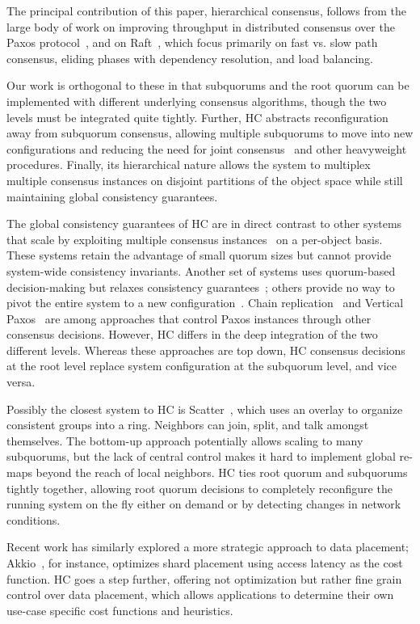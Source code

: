 \documentclass[11pt,conference]{IEEEtran}
\newcommand{\hc}{hierarchical consensus\xspace}
\newcommand{\sub}{subquorum\xspace}
\newcommand{\subs}{subquorums\xspace}
\newcommand{\roo}{root quorum\xspace}
\begin{document}
The principal contribution of this paper, \hc, follows from the
large body of work on improving throughput in distributed consensus 
over the Paxos protocol~\cite{paxos_simple,epaxos,flexible_paxos,generalized_paxos}, 
and on Raft~\cite{raft,howard_raft_2015}, which focus primarily on fast vs.
slow path consensus, eliding phases with dependency resolution, and load
balancing.

Our work is orthogonal to these in that \subs and the \roo can be
implemented with different underlying consensus algorithms, though the
two levels must be integrated quite tightly.
Further, HC abstracts reconfiguration away from \sub consensus, allowing
multiple \subs to move into new configurations and reducing the need
for joint consensus~\cite{raft} and other heavyweight procedures.
Finally, its hierarchical nature allows the system to multiplex multiple
consensus instances on disjoint partitions of the object space while
still maintaining global consistency guarantees.

The global consistency guarantees of HC are in direct contrast to other
systems that scale by exploiting multiple consensus
instances~\cite{bigtable,mdcc,spanner} on a per-object basis.
These systems retain the advantage of small quorum sizes but cannot provide
system-wide consistency invariants.
Another set of systems uses quorum-based decision-making but relaxes
consistency guarantees~\cite{dynamo,pnuts,cops}; others provide no way to
pivot the entire system to a new configuration~\cite{scatter}.
Chain replication~\cite{van2004chain} and Vertical Paxos~\cite{vertical_paxos}
are among approaches that control Paxos instances through other consensus
decisions.
However, HC differs in the deep integration of the two different levels.
Whereas these approaches are top down, HC consensus decisions at the root
level replace system configuration at the \sub level, and vice versa.

Possibly the closest system to HC is Scatter~\cite{scatter}, which uses an
overlay to organize consistent groups into a ring.
Neighbors can join, split, and talk amongst themselves.
The bottom-up approach potentially allows scaling to many
\subs, but the lack of central control makes it hard to implement global
re-maps beyond the reach of local neighbors.
HC ties \roo and \subs tightly together, allowing \roo decisions to
completely reconfigure the running system on the fly either on demand or
by detecting changes in network conditions.

Recent work has similarly explored a more strategic approach to data placement;
Akkio~\cite{akkio}, for instance, optimizes shard placement using access
latency as the cost function. 
HC goes a step further, offering not optimization but rather fine grain control
over data placement, which allows applications to determine their own
use-case specific cost functions and heuristics.
\end{document}
